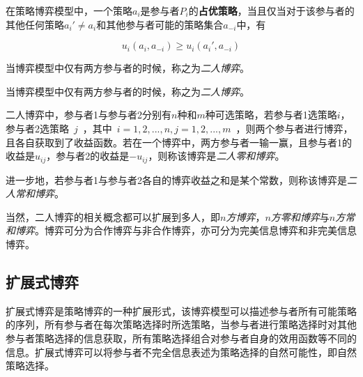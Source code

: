 \begin{definition}
	在策略博弈模型中，一个策略$a_i$是参与者$P_i$的\textbf{占优策略}，当且仅当对于该参与者的其他任何策略$a_i'\neq a_i$和其他参与者可能的策略集合$a_{-i}$中，有
	
	\begin{equation}
	u_i(a_i,a_{-i}) \geq 	u_i(a_i',a_{-i})
	\end{equation}
\end{definition}

\begin{definition}
	当博弈模型中仅有两方参与者的时候，称之为\textit{二人博弈}。
\end{definition}

\begin{definition}
当博弈模型中仅有两方参与者的时候，称之为\textit{二人博弈}。
\end{definition}

\begin{definition}
二人博弈中，参与者1与参与者2分别有$n$种和$m$种可选策略，若参与者1选策略$i$，参与者2选策略~$j$~，其中~$i=1,2,...,n,j=1,2,...,m$~，则两个参与者进行博弈，且各自获取到了收益函数。若在一个博弈中，两方参与者一输一赢，且参与者1的收益是$u_{ij}$，参与者2的收益是$-u_{ij}$，则称该博弈是\textit{二人零和博弈}。
\end{definition}

\begin{definition}
	进一步地，若参与者1与参与者2各自的博弈收益之和是某个常数，则称该博弈是\textit{二人常和博弈}。
\end{definition}

当然，二人博弈的相关概念都可以扩展到多人，即\textit{$n$方博弈}，\textit{$n$方零和博弈}与\textit{$n$方常和博弈}。博弈可分为合作博弈与非合作博弈，亦可分为完美信息博弈和非完美信息博弈。



\subsection{扩展式博弈}

扩展式博弈是策略博弈的一种扩展形式，该博弈模型可以描述参与者所有可能策略的序列，所有参与者在每次策略选择时所选策略，当参与者进行策略选择时对其他参与者策略选择的信息获取，所有策略选择组合对参与者自身的效用函数等不同的信息。扩展式博弈可以将参与者不完全信息表述为策略选择的自然可能性，即自然策略选择。

